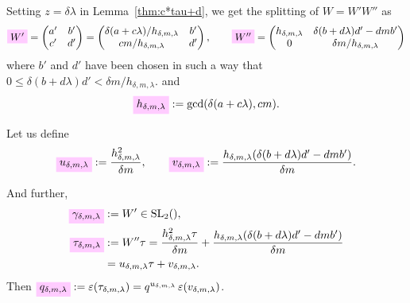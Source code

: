 \documentclass{article}
\begin{document}
Setting $z = \delta \lambda$ in Lemma~\ref{thm:c*tau+d}, we get the
splitting of $W = W' W''$ as
%
\begin{gather}
  \defineNotation[W']{W'}
  =
  \begin{pmatrix}
    a' & b'\\
    c' & d'
  \end{pmatrix}
  = \begin{pmatrix}
      \delta(a+c \lambda)/h_{\delta,m,\lambda} & b'\\
      cm/h_{\delta,m,\lambda}                  & d'
    \end{pmatrix},
  \qquad
  \defineNotation[W'']{W''}
  =
  \begin{pmatrix}
    h_{\delta,m,\lambda} & \delta (b + d \lambda) d' - d m b'\\
    0               & \delta m / h_{\delta,m,\lambda}
  \end{pmatrix}
  \label{eq:split-W_delta-m-lambda}
\end{gather}
where $b'$ and $d'$ have been chosen in such a way that
$0\le  \delta (b + d \lambda) d' < \delta m / h_{\delta,m,\lambda}$.
and
\begin{gather}
  \defineNotation[h-delta-m-lambda]{h_{\delta,m,\lambda}} :=
  \gcd(\delta (a + c \lambda), cm).
\end{gather}

Let us define
\begin{gather}
  \defineNotation[u-delta-m-lambda]{u_{\delta,m,\lambda}}
  :=
  \frac{h_{\delta,m,\lambda}^2}{\delta m},
  \qquad
  \defineNotation[v-delta-m-lambda]{v_{\delta,m,\lambda}}
  :=
  \frac{h_{\delta,m,\lambda}(\delta (b + d \lambda) d' - d m b')}{\delta m}.
\end{gather}

And further,
\begin{align}
  \defineNotation[gamma-delta-m-lambda]{\gamma_{\delta,m,\lambda}}
  &:=
    W'\in\SL2Z,
    \label{eq:gamma_delta-m-lambda}
  \\
  \defineNotation[tau-delta-m-lambda]{\tau_{\delta,m,\lambda}}
  &:=
    W''\tau
    = \frac{h_{\delta,m,\lambda}^2 \tau}{\delta m} +
    \frac{h_{\delta,m,\lambda}(\delta (b + d \lambda) d' - d m
    b')}{\delta m}
  \notag\\
    &= u_{\delta,m,\lambda} \tau + v_{\delta,m,\lambda}.
  \label{eq:tau_delta-m-lambda}
\end{align}
Then
$\defineNotation[q-delta-m-lambda]{q_{\delta,m,\lambda}} :=
\unityPower{\tau_{\delta,m,\lambda}} =
q^{u_{\delta,m,\lambda}}\,\unityPower{v_{\delta,m,\lambda}}$.
\end{document}
